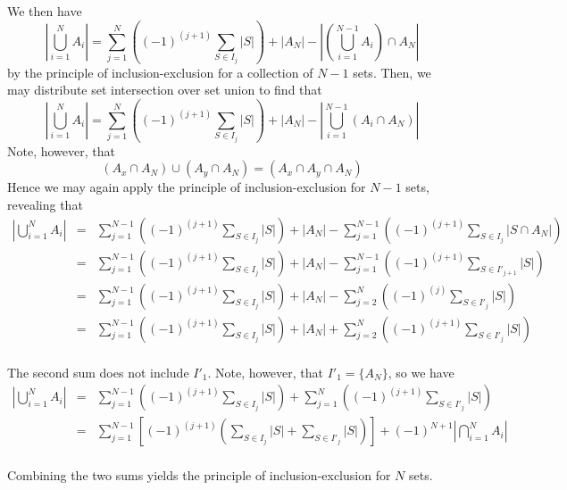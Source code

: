 \documentclass[12pt]{article}
\begin{document}
We then have
$$\left | \bigcup_{i=1}^N A_i \right | = \sum_{j=1}^N \left( (-1)^{(j+1)} \sum_{S\in I_j} |S| \right ) + |A_N| - \left|\left( \bigcup_{i=1}^{N-1} A_i \right ) \cap A_N \right|$$
by the principle of inclusion-exclusion for a collection of $N-1$ sets.  Then, we may distribute set intersection over set union to find that
$$\left | \bigcup_{i=1}^N A_i \right | = \sum_{j=1}^N \left( (-1)^{(j+1)} \sum_{S\in I_j} |S| \right ) + |A_N| - \left| \bigcup_{i=1}^{N-1} (A_i \cap A_N) \right |$$
Note, however, that $$(A_x \cap A_N) \cup (A_y \cap A_N) = (A_x \cap A_y \cap A_N)$$  Hence we may again apply the principle of inclusion-exclusion for $N-1$ sets, revealing that
\begin{eqnarray*}
\left | \bigcup_{i=1}^N A_i \right | &=& \sum_{j=1}^{N-1} \left( (-1)^{(j+1)} \sum_{S\in I_j} |S| \right ) + |A_N| - \sum_{j=1}^{N-1} \left( (-1)^{(j+1)} \sum_{S\in I_j} |S \cap A_N| \right ) \\
&=& \sum_{j=1}^{N-1} \left( (-1)^{(j+1)} \sum_{S\in I_j} |S| \right ) + |A_N| - \sum_{j=1}^{N-1} \left( (-1)^{(j+1)} \sum_{S\in I'_{j+1}} |S| \right ) \\
&=& \sum_{j=1}^{N-1} \left( (-1)^{(j+1)} \sum_{S\in I_j} |S| \right ) + |A_N| - \sum_{j=2}^{N} \left( (-1)^{(j)} \sum_{S\in I'_{j}} |S| \right ) \\
&=& \sum_{j=1}^{N-1} \left( (-1)^{(j+1)} \sum_{S\in I_j} |S| \right ) + |A_N| + \sum_{j=2}^{N} \left( (-1)^{(j+1)} \sum_{S\in I'_{j}} |S| \right ) \\
\end{eqnarray*}

The second sum does not include $I'_1$.  Note, however, that $I'_1 = \{ A_N \}$, so we have
\begin{eqnarray*}
\left | \bigcup_{i=1}^N A_i \right | &=& \sum_{j=1}^{N-1} \left( (-1)^{(j+1)} \sum_{S\in I_j} |S| \right ) + \sum_{j=1}^{N} \left( (-1)^{(j+1)} \sum_{S\in I'_{j}} |S| \right ) \\
&=& \sum_{j=1}^{N-1} \left[ (-1)^{(j+1)} \left(  \sum_{S\in I_j} |S| + \sum_{S\in I'_{j}} |S| \right ) \right]
+(-1)^{N+1}\left | \bigcap_{i=1}^N A_i\right | \\
\end{eqnarray*}

Combining the two sums yields the principle of inclusion-exclusion for $N$ sets.
\end{document}
